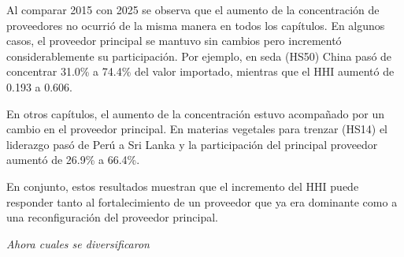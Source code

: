\documentclass[
]{article}
\begin{document}
Al comparar 2015 con 2025 se observa que el aumento de la concentración
de proveedores no ocurrió de la misma manera en todos los capítulos. En
algunos casos, el proveedor principal se mantuvo sin cambios pero
incrementó considerablemente su participación. Por ejemplo, en seda
(HS50) China pasó de concentrar 31.0\% a 74.4\% del valor importado,
mientras que el HHI aumentó de 0.193 a 0.606.

En otros capítulos, el aumento de la concentración estuvo acompañado por
un cambio en el proveedor principal. En materias vegetales para trenzar
(HS14) el liderazgo pasó de Perú a Sri Lanka y la participación del
principal proveedor aumentó de 26.9\% a 66.4\%.

En conjunto, estos resultados muestran que el incremento del HHI puede
responder tanto al fortalecimiento de un proveedor que ya era dominante
como a una reconfiguración del proveedor principal.

\emph{Ahora cuales se diversificaron}
\end{document}
